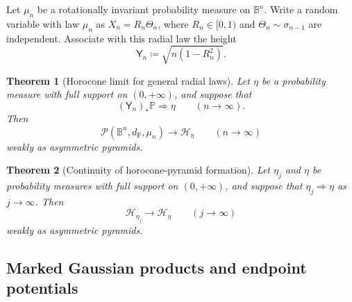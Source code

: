 \documentclass{amsart}
\numberwithin{equation}{section}
\theoremstyle{plain}
\newtheorem{theorem}{Theorem}[section]
\theoremstyle{definition}
\theoremstyle{remark}
\newcommand{\B}{\mathbb B}
\newcommand{\Pyr}{\mathcal P}
\newcommand{\dF}{d_{\mathrm F}}
\begin{document}
Let $\mu_n$ be a rotationally invariant probability measure on $\B^n$.  Write a random variable with law $\mu_n$ as
$X_n=R_n\Theta_n$, where $R_n\in[0,1)$ and $\Theta_n\sim\sigma_{n-1}$ are independent.  Associate with this radial law the height
\begin{equation}\label{eq:general-radial-height} \mathsf Y_n\coloneqq\sqrt{n(1-R_n^2)}. \end{equation}

\begin{theorem}[Horocone limit for general radial laws]\label{thm:radial-law-transfer}
Let $\eta$ be a probability measure with full support on $(0,+\infty)$, and suppose that
\begin{equation}\label{eq:height-convergence-assumption}
 (\mathsf Y_n)_*\mathbb P\Rightarrow\eta\qquad(n\to\infty).
\end{equation}
Then
\begin{equation}\label{eq:radial-law-pyramid-limit}
 \Pyr(\B^n,\dF,\mu_n)\longrightarrow\mathcal H_\eta\qquad(n\to\infty)
\end{equation}
weakly as asymmetric pyramids.
\end{theorem}

\begin{theorem}[Continuity of horocone-pyramid formation]\label{thm:height-law-pyramid-continuity}
Let $\eta_j$ and $\eta$ be probability measures with full support on $(0,+\infty)$, and suppose that
$\eta_j\Rightarrow\eta$ as $j\to\infty$.  Then
\begin{equation}\label{eq:height-law-pyramid-continuity}
 \mathcal H_{\eta_j}\longrightarrow\mathcal H_\eta\qquad(j\to\infty)
\end{equation}
weakly as asymmetric pyramids.
\end{theorem}

\subsection{Marked Gaussian products and endpoint potentials}
\end{document}
